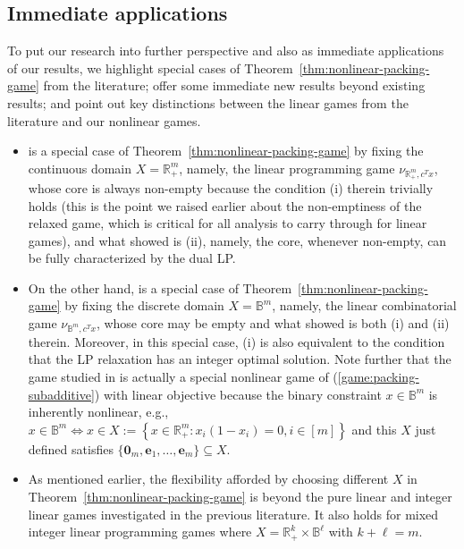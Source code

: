 \documentclass[11pt]{article}\usepackage[]{graphicx}\usepackage[]{xcolor}
\begin{document}
\subsection{Immediate applications}\label{subsec:immediate-applications}
To put our research into further perspective and also as immediate applications of our results, we highlight special cases of Theorem~\ref{thm:nonlinear-packing-game} from the literature; offer some immediate new results beyond existing results; and point out key distinctions between the linear games from the literature and our nonlinear games. 
\begin{itemize}
\item \citep[Theorem 4]{samet1984core} is a special case of Theorem~\ref{thm:nonlinear-packing-game} by fixing the continuous domain $X=\mathbb{R}^m_{+}$, namely, the linear programming game $\nu_{\mathbb{R}^m_{+},c^Tx}$, whose core is always non-empty because the condition (i) therein trivially holds (this is the point we raised earlier about the non-emptiness of the relaxed game, which is critical for all analysis to carry through for linear games), and what \citep[Theorem 4]{samet1984core} showed is (ii), namely, the core, whenever non-empty, can be fully characterized by the dual LP. 
\item On the other hand, \citep[Theorem 1]{deng1999algorithmic} is a special case of Theorem~\ref{thm:nonlinear-packing-game} by fixing the discrete domain $X=\mathbb{B}^m$, namely, the linear combinatorial game $\nu_{\mathbb{B}^m, c^Tx}$, whose core may be empty and what \citep[Theorem 1]{deng1999algorithmic} showed is both (i) and (ii) therein. Moreover, in this special case, (i) is also equivalent to the condition that the LP relaxation has an integer optimal solution. Note further that the game studied in \citep{deng1999algorithmic} is actually a special nonlinear game of (\ref{game:packing-subadditive}) with linear objective because the binary constraint $x\in \mathbb{B}^m$ is inherently nonlinear, e.g., $x\in \mathbb{B}^m \iff x\in X:=\left\{x\in \mathbb{R}^m_{+}: x_i(1-x_i)=0, i\in [m]\right\}$ and this $X$ just defined satisfies $\{\mathbf{0}_m, \mathbf{e}_1,\dots, \mathbf{e}_m\}\subseteq X$. 
\item As mentioned earlier, the flexibility afforded by choosing different $X$ in Theorem~\ref{thm:nonlinear-packing-game} is beyond the pure linear and integer linear games investigated in the previous literature. It also holds for mixed integer linear programming games where $X=\mathbb{R}^k_{+}\times \mathbb{B}^{\ell}$ with $k+\ell=m$. 


\end{itemize}
\end{document}
